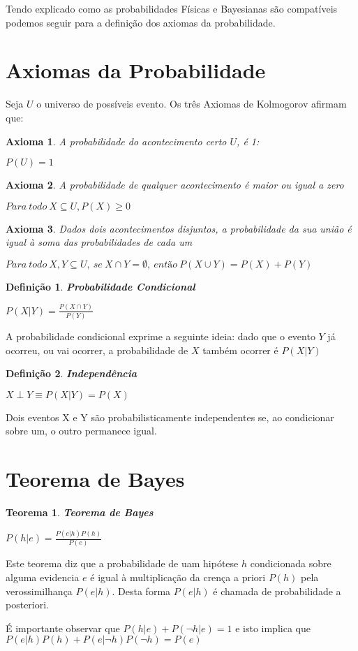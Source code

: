 Tendo explicado como as probabilidades Físicas e Bayesianas são compatíveis podemos seguir para a definição dos axiomas da probabilidade. 

\section{Axiomas da Probabilidade}
Seja $U$ o universo de possíveis evento. Os três Axiomas de Kolmogorov \cite{kolmogorov33} afirmam que:

\newtheorem{kolg1}{Axioma}[chapter]
\newtheorem{kolg2}[kolg1]{Axioma}
\newtheorem{kolg3}[kolg1]{Axioma}
\begin{kolg1}
	A probabilidade do acontecimento certo $U$, é 1:
	
	\centering $P(U) = 1$
\end{kolg1}
 

\begin{kolg2}
	A probabilidade de qualquer acontecimento é maior ou igual a zero 
	
	\centering $Para\ todo\ X \subseteq U, P(X) \ge 0$
\end{kolg2}


\begin{kolg3}
	Dados dois acontecimentos disjuntos, a probabilidade da sua união é igual à soma das probabilidades de cada um 
	
	\centering $Para\ todo\ X, Y \subseteq U,\ se\ X \cap Y = \emptyset,\ então\ P(X \cup Y) = P(X) + P(Y)$
\end{kolg3}

\newtheorem{cond_prob}{Definição}[chapter]
\begin{cond_prob}
	\textbf{Probabilidade Condicional}
	
	\centering $P(X|Y) = \frac{P(X \cap Y)}{P(Y)}$
\end{cond_prob}
A probabilidade condicional exprime a seguinte ideia: dado que o evento $Y$ já ocorreu, ou vai ocorrer, a probabilidade de $X$ também ocorrer é $P(X|Y)$

\newtheorem{independence}[cond_prob]{Definição}
\begin{independence}
	\textbf{Independência}

	\centering	$X \perp Y \equiv P(X|Y) = P(X)$
\end{independence}
Dois eventos X e Y são probabilisticamente independentes se, ao condicionar sobre um, o outro permanece igual.

\section{Teorema de Bayes}
\newtheorem{bayes}{Teorema}[chapter]
\begin{bayes}
	\textbf{Teorema de Bayes}
	
	\centering $P(h|e) = \frac{P(e|h)P(h)}{P(e)}$
\end{bayes}
Este teorema diz que a probabilidade de uam hipótese $h$ condicionada sobre alguma evidencia $e$ é igual à multiplicação da crença a priori $P(h)$ pela verossimilhança $P(e|h)$. Desta forma $P(e|h)$ é chamada de probabilidade a posteriori.

É importante observar que $P(h|e)+P(\neg  h|e) = 1$ e isto implica que $P(e|h)P(h) +P(e|\neg h)P(\neg h)= P(e)$

